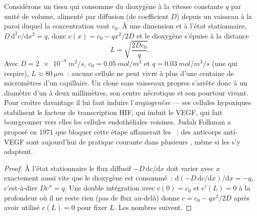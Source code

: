 \begin{proposition}\label{prop:b3:cancer-biology:oxygen}
Considérons un tissu qui consomme du dioxygène à la vitesse constante
$q$ par unité de volume, alimenté par diffusion (de coefficient $D$)
depuis un vaisseau à la paroi duquel la concentration vaut $c_{0}$. À
une dimension et à l'état stationnaire, $D\,
\mathrm{d}^{2}c/\mathrm{d}x^{2} = q$, donc $c(x) = c_{0} - qx^{2}/2D$ et
le dioxygène s'épuise à la distance
\[
L = \sqrt{\frac{2Dc_{0}}{q}} .
\]
Avec $D = \qty{2e-9}{m^2/s}$, $c_{0} = \qty{0.05}{mol/m^3}$ et $q =
\qty{0.03}{mol/m^3/s}$ (une  qui respire), $L \approx \qty{80}{\micro
m}$~: aucune cellule ne peut vivre à plus d'une centaine de micromètres
d'un capillaire. Un clone sans vaisseaux propres s'arrête donc à un
diamètre d'un à deux millimètres, son centre nécrotique et son
pourtour vivant. Pour croître davantage il lui faut induire
l'\emph{angiogenèse} --- ses cellules hypoxiques stabilisent le facteur
de transcription HIF, qui induit le VEGF, qui fait bourgeonner vers
elles les cellules endothéliales voisines. Judah Folkman a proposé en
1971 que bloquer cette étape affamerait les ~; des anticorps
anti-VEGF sont aujourd'hui de pratique courante dans plusieurs ,
même si les  s'y adaptent.
\end{proposition}
\begin{proof}
À l'état stationnaire le flux diffusif $-D\,\mathrm{d}c/\mathrm{d}x$
doit varier avec $x$ exactement aussi vite que le dioxygène est
consommé~: $\mathrm{d}(-D\,
\mathrm{d}c/\mathrm{d}x)/\mathrm{d}x = -q$, c'est-à-dire $D c'' = q$.
Une double intégration avec $c(0) = c_{0}$ et $c'(L) = 0$ à la
profondeur où il ne reste rien (pas de flux au-delà) donne
$c = c_{0} - qx^{2}/2D$ après avoir utilisé $c(L) = 0$ pour fixer $L$.
Les nombres suivent.
\end{proof}

